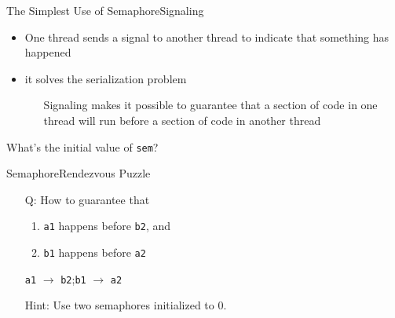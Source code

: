 \begin{frame}{The Simplest Use of Semaphore}{Signaling}
  \begin{itemize}
  \item One thread sends a signal to another thread to indicate that something has
    happened
  \item it solves the serialization problem
    \begin{itemize}
    \item[] Signaling makes it possible to guarantee that a section of code in one thread
      will run before a section of code in another thread
    \end{itemize}
  \end{itemize}
  \begin{center}
  \end{center}
  \begin{center}
    What's the initial value of \texttt{sem}?
  \end{center}
\end{frame}

\begin{frame}{Semaphore}{Rendezvous Puzzle}
  \begin{center}
  \end{center}
  \begin{itemize}
  \item[Q:] How to guarantee that
    \begin{enumerate}
    \item \texttt{a1} happens before \texttt{b2}, and
    \item \texttt{b1} happens before \texttt{a2}
    \end{enumerate}
    \texttt{a1} $\rightarrow{}$ \texttt{b2};\quad \texttt{b1} $\rightarrow{}$ \texttt{a2}
  \item[Hint:] Use two semaphores initialized to 0.
  \end{itemize}
\end{frame}

